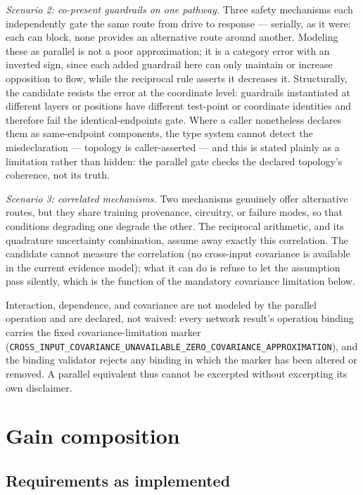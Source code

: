 \emph{Scenario 2: co-present guardrails on one pathway.} Three safety
mechanisms each independently gate the same route from drive to response
--- serially, as it were: each can block, none provides an alternative
route around another. Modeling these as parallel is not a poor
approximation; it is a category error with an inverted sign, since each
added guardrail here can only maintain or increase opposition to flow,
while the reciprocal rule asserts it decreases it. Structurally, the
candidate resists the error at the coordinate level: guardrails
instantiated at different layers or positions have different test-point or
coordinate identities and therefore fail the identical-endpoints gate.
Where a caller nonetheless declares them as same-endpoint components, the
type system cannot detect the misdeclaration --- topology is caller-asserted
--- and this is stated plainly as a limitation rather than hidden: the
parallel gate checks the declared topology's coherence, not its truth.

\emph{Scenario 3: correlated mechanisms.} Two mechanisms genuinely offer
alternative routes, but they share training provenance, circuitry, or
failure modes, so that conditions degrading one degrade the other. The
reciprocal arithmetic, and its quadrature uncertainty combination, assume
away exactly this correlation. The candidate cannot measure the
correlation (no cross-input covariance is available in the current
evidence model); what it can do is refuse to let the assumption pass
silently, which is the function of the mandatory covariance limitation
below.

\begin{ruleenv}\label{ch09:rule:parallel-limits}
Interaction, dependence, and covariance are not modeled by the parallel
operation and are declared, not waived: every network result's operation
binding carries the fixed covariance-limitation marker
(\texttt{CROSS\_INPUT\_COVARIANCE\_UNAVAILABLE\_ZERO\_COVARIANCE\_APPROXIMATION}),
and the binding validator rejects any binding in which the marker has been
altered or removed. A parallel equivalent thus cannot be excerpted without
excerpting its own disclaimer.
\end{ruleenv}

\section{Gain composition}\label{ch09:sec:gain}

\subsection{Requirements as implemented}


